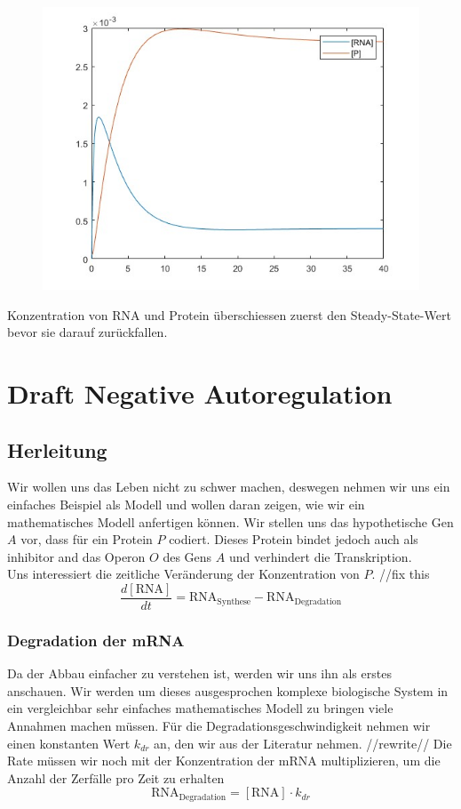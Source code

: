 \documentclass{article}
\begin{document}
\begin{figure}[h]
    \centering
    \includegraphics[width=0.8\linewidth]{images/negative_autoregulation.jpg}
\end{figure}

Konzentration von RNA und Protein überschiessen zuerst den Steady-State-Wert bevor sie darauf zurückfallen.

\newpage
\section{Draft Negative Autoregulation}
\subsection{Herleitung}
Wir wollen uns das Leben nicht zu schwer machen, deswegen nehmen wir uns ein einfaches Beispiel als Modell und wollen daran zeigen, wie wir ein mathematisches Modell anfertigen können.
Wir stellen uns das hypothetische Gen $A$ vor, dass für ein Protein $P$ codiert. Dieses Protein bindet jedoch auch als inhibitor and das Operon $O$ des Gens $A$ und verhindert die Transkription.\\
Uns interessiert die zeitliche Veränderung der Konzentration von $P$. //fix this
\begin{equation} \label{eq:1}
    \frac{d[\text{RNA}]}{dt}=\text{RNA}_{\text{Synthese}}-\text{RNA}_{\text{Degradation}}
\end{equation}
\subsubsection{Degradation der mRNA}
Da der Abbau einfacher zu verstehen ist, werden wir uns ihn als erstes anschauen. Wir werden um dieses ausgesprochen komplexe biologische System in ein vergleichbar sehr einfaches mathematisches Modell zu bringen viele Annahmen machen müssen. Für die Degradationsgeschwindigkeit nehmen wir einen konstanten Wert $k_{dr}$ an, den wir aus der Literatur\cite{lacoperon} nehmen. //rewrite// Die Rate müssen wir noch mit der Konzentration der mRNA multiplizieren, um die Anzahl der Zerfälle pro Zeit zu erhalten
\begin{equation} \label{eq:2}
    \text{RNA}_{\text{Degradation}}=[\text{RNA}] \cdot k_{dr}
\end{equation}
\end{document}
